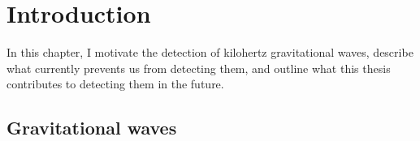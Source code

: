 \chapter{Introduction} %
\label{ref:introduction}





In this chapter, I motivate the detection of kilohertz gravitational waves, describe what currently prevents us from detecting them, and outline what this thesis contributes to detecting them in the future.

\section{Gravitational waves}
\label{sec:gravWaves}

